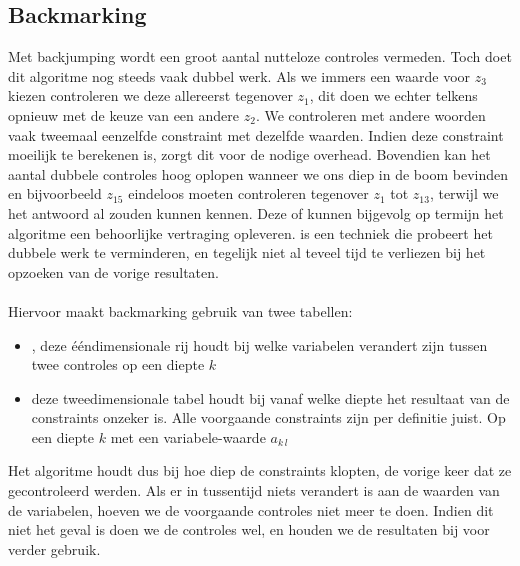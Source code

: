 \subsection{Backmarking}
Met backjumping wordt een groot aantal nutteloze controles vermeden. Toch doet dit algoritme nog steeds vaak dubbel werk. Als we immers een waarde voor $z_3$ kiezen controleren we deze allereerst tegenover $z_1$, dit doen we echter telkens opnieuw met de keuze van een andere $z_2$. We controleren met andere woorden vaak tweemaal eenzelfde constraint met dezelfde waarden. Indien deze constraint moeilijk te berekenen is, zorgt dit voor de nodige overhead. Bovendien kan het aantal dubbele controles hoog oplopen wanneer we ons diep in de boom bevinden en bijvoorbeeld $z_{15}$ eindeloos moeten controleren tegenover $z_1$ tot $z_{13}$, terwijl we het antwoord al zouden kunnen kennen. Deze  of  kunnen bijgevolg op termijn het algoritme een behoorlijke vertraging opleveren.  is een techniek die probeert het dubbele werk te verminderen, en tegelijk niet al teveel tijd te verliezen bij het opzoeken van de vorige resultaten.
\paragraph{}
Hiervoor maakt backmarking gebruik van twee tabellen:
\begin{itemize}
 \item {}, deze \'e\'endimensionale rij houdt bij welke variabelen verandert zijn tussen twee controles op een diepte $k$
 \item {} deze tweedimensionale tabel houdt bij vanaf welke diepte het resultaat van de constraints onzeker is. Alle voorgaande constraints zijn per definitie juist. Op een diepte $k$ met een variabele-waarde $a_{k\,l}$
\end{itemize}
Het algoritme houdt dus bij hoe diep de constraints klopten, de vorige keer dat ze gecontroleerd werden. Als er in tussentijd niets verandert is aan de waarden van de variabelen, hoeven we de voorgaande controles niet meer te doen. Indien dit niet het geval is doen we de controles wel, en houden we de resultaten bij voor verder gebruik.
